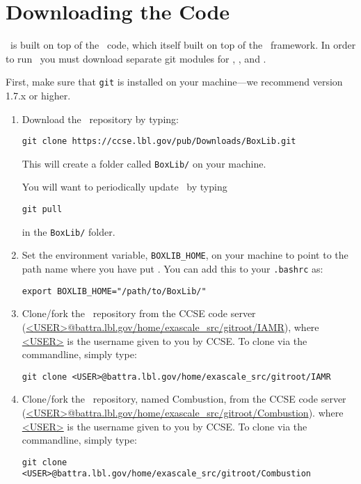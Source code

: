 
\section{Downloading the Code}

\lmc\ is built on top of the \iamr\ code, which itself built on top of the \boxlib\ framework.  In order to run
\lmc\, you must download separate git modules for \lmc, \iamr, and \boxlib.

\vspace{.1in}

\noindent First, make sure that {\tt git} is installed on your machine---we recommend version 1.7.x or higher.

\vspace{.1in}

\begin{enumerate}

\item Download the \boxlib\ repository by typing: 
\begin{verbatim}
git clone https://ccse.lbl.gov/pub/Downloads/BoxLib.git
\end{verbatim}

This will create a folder called {\tt BoxLib/} on your machine.

You will want to periodically update \boxlib\ by typing
\begin{verbatim}
git pull
\end{verbatim}
in the {\tt BoxLib/} folder.  

\item Set the environment variable, {\tt BOXLIB\_HOME}, on your
  machine to point to the path name where you have put \boxlib.
  You can add this to your {\tt .bashrc} as:
\begin{verbatim}
export BOXLIB_HOME="/path/to/BoxLib/"
\end{verbatim}

\item Clone/fork the \iamr\ repository from the CCSE code server
  (\url{<USER>@battra.lbl.gov/home/exascale_src/gitroot/IAMR}),
  where \url{<USER>} is the username given to you by CCSE. To
  clone via the commandline, simply type:
\begin{verbatim}
git clone <USER>@battra.lbl.gov/home/exascale_src/gitroot/IAMR
\end{verbatim}

\item Clone/fork the \lmc\ repository, named {\sf Combustion}, from the CCSE code server
  (\url{<USER>@battra.lbl.gov/home/exascale_src/gitroot/Combustion}).
  where \url{<USER>} is the username given to you by CCSE. To
  clone via the commandline, simply type:
\begin{verbatim}
git clone <USER>@battra.lbl.gov/home/exascale_src/gitroot/Combustion
\end{verbatim}

\end{enumerate}

